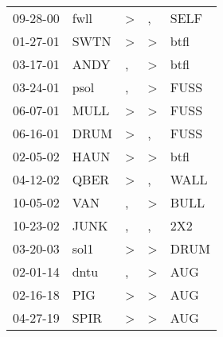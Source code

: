 \begin{supertabular}{lllll}
 09-28-00 &  fwll &  \textgreater &             , &  SELF \\
 01-27-01 &  SWTN &  \textgreater &  \textgreater &  btfl \\
 03-17-01 &  ANDY &             , &  \textgreater &  btfl \\
 03-24-01 &  psol &             , &  \textgreater &  FUSS \\
 06-07-01 &  MULL &  \textgreater &  \textgreater &  FUSS \\
 06-16-01 &  DRUM &  \textgreater &             , &  FUSS \\
 02-05-02 &  HAUN &  \textgreater &  \textgreater &  btfl \\
 04-12-02 &  QBER &  \textgreater &             , &  WALL \\
 10-05-02 &   VAN &             , &  \textgreater &  BULL \\
 10-23-02 &  JUNK &             , &             , &   2X2 \\
 03-20-03 &  sol1 &  \textgreater &  \textgreater &  DRUM \\
 02-01-14 &  dntu &             , &  \textgreater &   AUG \\
 02-16-18 &   PIG &  \textgreater &  \textgreater &   AUG \\
 04-27-19 &  SPIR &  \textgreater &  \textgreater &   AUG \\
\end{supertabular}

